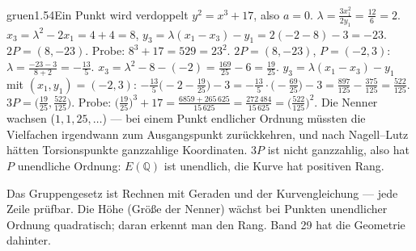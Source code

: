 \begin{loesungkarte}{gruen}{1.54}{Ein Punkt wird verdoppelt}
$y^{2} = x^{3} + 17$, also $a = 0$. $\lambda = \frac{3x_1^{2}}{2y_1} = \frac{12}6 = 2$. $x_3 = \lambda^{2} - 2x_1 = 4 + 4 = 8$, $y_3 = \lambda(x_1 - x_3) - y_1 = 2(-2 - 8) - 3 = -23$. $2P = (8, -23)$. Probe: $8^{3} + 17 = 529 = 23^{2}$. \checkmark
{}
$2P = (8, -23)$, $P = (-2, 3)$: $\lambda = \frac{-23 - 3}{8 + 2} = -\frac{13}5$. $x_3 = \lambda^{2} - 8 - (-2) = \frac{169}{25} - 6 = \frac{19}{25}$. $y_3 = \lambda(x_1 - x_3) - y_1$ mit $(x_1, y_1) = (-2, 3)$: $-\frac{13}5\bigl(-2 - \frac{19}{25}\bigr) - 3 = -\frac{13}5\cdot\bigl(-\frac{69}{25}\bigr) - 3 = \frac{897}{125} - \frac{375}{125} = \frac{522}{125}$. $3P = \bigl(\frac{19}{25}, \frac{522}{125}\bigr)$. Probe: $\bigl(\frac{19}{25}\bigr)^{3} + 17 = \frac{6859 + 265\,625}{15\,625} = \frac{272\,484}{15\,625} = \bigl(\frac{522}{125}\bigr)^{2}$. \checkmark
{}
Die Nenner wachsen ($1, 1, 25, \dots$) --- bei einem Punkt endlicher Ordnung müssten die Vielfachen irgendwann zum Ausgangspunkt zurückkehren, und nach Nagell--Lutz hätten Torsionspunkte ganzzahlige Koordinaten. $3P$ ist nicht ganzzahlig, also hat $P$ unendliche Ordnung: $E(\mathbb Q)$ ist unendlich, die Kurve hat positiven Rang.
\begin{mitnehmen}\kastentext
Das Gruppengesetz ist Rechnen mit Geraden und der Kurvengleichung --- jede Zeile prüfbar. Die Höhe (Größe der Nenner) wächst bei Punkten unendlicher Ordnung quadratisch; daran erkennt man den Rang. Band 29 hat die Geometrie dahinter.
\end{mitnehmen}
\end{loesungkarte}

